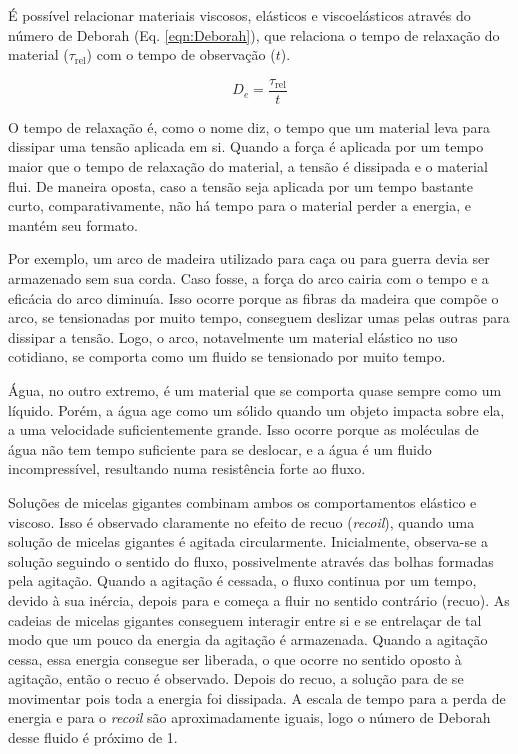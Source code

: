 		É possível relacionar materiais viscosos, elásticos e viscoelásticos através do número de Deborah (Eq. \ref{eqn:Deborah}), que relaciona o tempo de relaxação do material (\(\tau_{\mathrm{rel}}\)) com o tempo de observação (\(t\)).
		
		\begin{equation}
			D_e = \dfrac{\tau_{\text{rel}}}{t}
			\label{eqn:Deborah}
		\end{equation}
		
		O tempo de relaxação é, como o nome diz, o tempo que um material leva para dissipar uma tensão aplicada em si. Quando a força é aplicada por um tempo maior que o tempo de relaxação do material, a tensão é dissipada e o material flui. De maneira oposta, caso a tensão seja aplicada por um tempo bastante curto, comparativamente, não há tempo para o material perder a energia, e mantém seu formato.
		
		Por exemplo, um arco de madeira utilizado para caça ou para guerra devia ser armazenado sem sua corda. Caso fosse, a força do arco cairia com o tempo e a eficácia do arco diminuía. Isso ocorre porque as fibras da madeira que compõe o arco, se tensionadas por muito tempo, conseguem deslizar umas pelas outras para dissipar a tensão. Logo, o arco, notavelmente um material elástico no uso cotidiano, se comporta como um fluido se tensionado por muito tempo.
		
		Água, no outro extremo, é um material que se comporta quase sempre como um líquido. Porém, a água age como um sólido quando um objeto impacta sobre ela, a uma velocidade suficientemente grande. Isso ocorre porque as moléculas de água não tem tempo suficiente para se deslocar, e a água é um fluido incompressível, resultando numa resistência forte ao fluxo.
		
		Soluções de micelas gigantes combinam ambos os comportamentos elástico e viscoso. Isso é observado claramente no efeito de recuo (\emph{recoil}), quando uma solução de micelas gigantes é agitada circularmente. Inicialmente, observa-se a solução seguindo o sentido do fluxo, possivelmente através das bolhas formadas pela agitação. Quando a agitação é cessada, o fluxo continua por um tempo, devido à sua inércia, depois para e começa a fluir no sentido contrário (recuo). As cadeias de micelas gigantes conseguem interagir entre si e se entrelaçar de tal modo que um pouco da energia da agitação é armazenada. Quando a agitação cessa, essa energia consegue ser liberada, o que ocorre no sentido oposto à agitação, então o recuo é observado. Depois do recuo, a solução para de se movimentar pois toda a energia foi dissipada. A escala de tempo para a perda de energia e para o \emph{recoil} são aproximadamente iguais, logo o número de Deborah desse fluido é próximo de 1.
		
